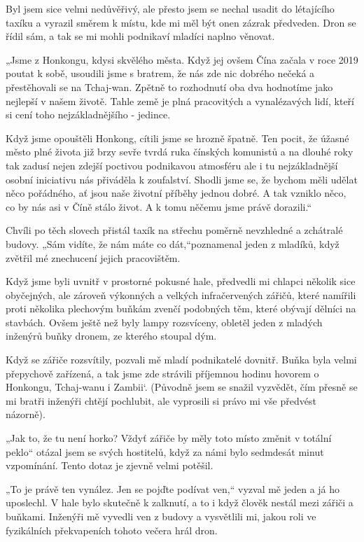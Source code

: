 Byl jsem sice velmi nedůvěřivý, ale přesto jsem se nechal usadit do létajícího taxíku a vyrazil směrem k místu, kde mi měl být onen zázrak předveden. Dron se řídil sám, a tak se mi mohli podnikaví mladíci naplno věnovat.

„Jsme z Honkongu, kdysi skvělého města. Když jej ovšem Čína začala v roce 2019 poutat k sobě, usoudili jsme s bratrem, že nás zde nic dobrého nečeká a přestěhovali se na Tchaj-wan. Zpětně to rozhodnutí oba dva hodnotíme jako nejlepší v našem životě. Tahle země je plná pracovitých a vynalézavých lidí, kteří si cení toho nejzákladnějšího - jedince.

Když jsme opouštěli Honkong, cítili jsme se hrozně špatně. Ten pocit, že úžasné město plné života již brzy sevře tvrdá ruka čínských komunistů a na dlouhé roky tak zadusí nejen zdejší poctivou podnikavou atmosféru ale i tu nejzákladnější osobní iniciativu nás přiváděla k zoufalství. Shodli jsme se, že bychom měli udělat něco pořádného, ať jsou naše životní příběhy jednou dobré. A tak vzniklo něco, co by nás asi v Číně stálo život. A k tomu něčemu jsme právě dorazili.“

Chvíli po těch slovech přistál taxík na střechu poměrně nevzhledné a zchátralé budovy. „Sám vidíte, že nám máte co dát,“poznamenal jeden z mladíků, když zvětřil mé znechucení jejich pracovištěm.

Když jsme byli uvnitř v prostorné pokusné hale, předvedli mi chlapci několik sice obyčejných, ale zároveň výkonných a velkých infračervených zářičů, které namířili proti několika plechovým buňkám zvenčí podobných těm, které obývají dělníci na stavbách. Ovšem ještě než byly lampy rozsvíceny, obletěl jeden z mladých inženýrů buňky dronem, ze kterého stoupal dým.

Když se zářiče rozsvítily, pozvali mě mladí podnikatelé dovnitř. Buňka byla velmi přepychově zařízená, a tak jsme zde strávili příjemnou hodinu hovorem o Honkongu, Tchaj-wanu i Zambii‘. (Původně jsem se snažil vyzvědět, čím přesně se mi bratři inženýři chtějí pochlubit, ale vyprosili si právo mi vše předvést názorně).

„Jak to, že tu není horko? Vždyť zářiče by měly toto místo změnit v totální peklo“ otázal jsem se svých hostitelů, když za námi bylo sedmdesát minut vzpomínání. Tento dotaz je zjevně velmi potěšil.

„To je právě ten vynález. Jen se pojďte podívat ven,“ vyzval mě jeden a já ho uposlechl. V hale bylo skutečně k zalknutí, a to i když člověk nestál mezi zářiči a buňkami. Inženýři mě vyvedli ven z budovy a vysvětlili mi, jakou roli ve fyzikálních překvapeních tohoto večera hrál dron.

